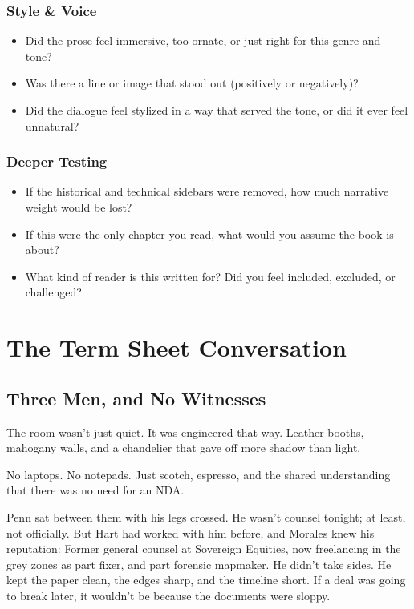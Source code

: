 \subsubsection{Style \& Voice}

\begin{itemize}
\item Did the prose feel immersive, too ornate, or just right for this genre and tone?
\item Was there a line or image that stood out (positively or negatively)?
\item Did the dialogue feel stylized in a way that served the tone, or did it ever feel unnatural?
\end{itemize}

\subsubsection{Deeper Testing}

\begin{itemize}
\item If the historical and technical sidebars were removed, how much narrative weight would be lost?
\item If this were the only chapter you read, what would you assume the book is about?
\item What kind of reader is this written for? Did you feel included, excluded, or challenged?
\end{itemize}





\section{The Term Sheet Conversation}

\subsection{Three Men, and No Witnesses}
The room wasn’t just quiet. It was engineered that way.
Leather booths, mahogany walls, and a chandelier that gave off more shadow than light.

No laptops. No notepads. Just scotch, espresso, and the shared understanding that there was 
no need for an NDA.

Penn sat between them with his legs crossed.
He wasn’t counsel tonight; at least, not officially.
But Hart had worked with him before, and Morales knew his reputation:
Former general counsel at Sovereign Equities, now freelancing in the grey zones as part fixer, and part 
forensic mapmaker.
He didn’t take sides. He kept the paper clean, the edges sharp, and the timeline short.
If a deal was going to break later, it wouldn’t be because the documents were sloppy.

